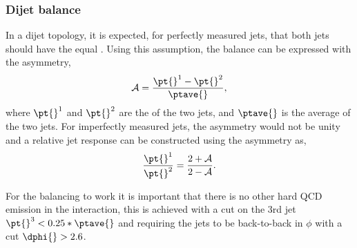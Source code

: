 \subsubsection{Dijet \pt{} balance}

In a dijet topology, it is expected, for perfectly measured jets, that both jets should have the equal \pt{}.
Using this assumption, the \pt{} balance can be expressed with the asymmetry,
\begin{equation}
\mathcal{A} =\frac{\pt{}^1 - \pt{}^2}{\ptave{}},
\label{JetPerf:Assym}
\end{equation}
where $\pt{}^1$ and $\pt{}^2$ are the \pt{} of the two jets, and $\ptave{}$ is the average \pt{} of the two jets.
For imperfectly measured jets, the asymmetry would not be unity and a relative jet response can be constructed using the asymmetry as,
\begin{equation}
 \frac{\pt{}^1}{\pt{}^2}=\frac{2+\mathcal{A}}{2-\mathcal{A}}.
\label{JetPerf:JetResp}
\end{equation}


For the balancing to work it is important that there is no other hard QCD emission in the interaction, this is achieved with a cut on the 3rd jet $\pt{}^3<0.25*\ptave{}$ and requiring the jets to be back-to-back in $\phi$ with a cut $\dphi{}>2.6$. 



